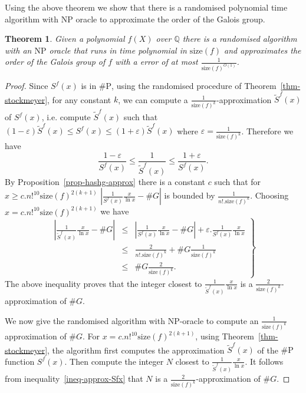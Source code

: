\documentclass[11pt]{madras}%
\newtheorem{theorem}{Theorem}[chapter]
\theoremstyle{remark}
\newcommand{\size}[1]{{\ensuremath{\mathrm{size}\left(#1\right)}}}
\begin{document}
Using the above theorem we show that there is a randomised polynomial
time algorithm with $\mathrm{NP}$ oracle to approximate the order of
the Galois group.

\begin{theorem}\label{thm-order-approximating}
  Given a polynomial $f(X)$ over $\mathbb{Q}$ there is a randomised
  algorithm with an $\mathrm{NP}$ oracle that runs in time polynomial
  in $\size{f}$ and approximates the order of the Galois group of $f$
  with a error of at most $\frac{1}{\size{f}^{O(1)}}$.
\end{theorem}
\begin{proof}
  Since $S^f(x)$ is in $\# \mathrm{P}$, using the randomised procedure
  of Theorem~\ref{thm-stockmeyer}, for any constant $k$, we can
  compute a $\frac{1}{\size{f}^k}$-approximation $\tilde{S}^f(x)$ of
  $S^f(x)$, i.e. compute $\tilde{S}^f(x)$ such that $(1 -
  \varepsilon)\tilde{S}^f(x) \leq S^f(x) \leq (1 + \varepsilon
  )\tilde{S}^f(x)$ where $\varepsilon = \frac{1}{\size{f}^k}$.
  Therefore we have
  \[
  \frac{1 - \varepsilon}{S^f(x)} \leq \frac{1}{\tilde{S}^f(x)} 
  \leq \frac{1 + \varepsilon}{S^f(x)}.
  \]
  By Proposition~\ref{prop-hashg-approx} there is a constant $c$ such
  that for $x \geq c. n!^{10}\size{f}^{2(k+1)}$
  $\left|\frac{1}{S^f(x)}\frac{x}{\ln{x}} - \# G\right|$ is bounded by
  $\frac{1}{n!.\size{f}^k}$. Choosing $x = c.
  n!^{10}\size{f}^{2(k+1)}$ we have
  \begin{equation}
    \left.
      \begin{array}{ccc}
        \left| \frac{1}{\tilde{S}^f(x)}\frac{x}{\ln{x}} - \# G \right| &\leq&
        \left|\frac{1}{S^f(x)}\frac{x}{\ln{x}} - \# G\right| + \varepsilon.
        \frac{1}{S^f(x)}\frac{x}{\ln{x}}\\
        &\leq& \frac{2}{n!.\size{f}^k} + \#G \frac{1}{\size{f}^k} \\
        &\leq& \#G \frac{2}{\size{f}^k}.
      \end{array}
    \right\}
    \label{ineq-approx-Sfx}
  \end{equation}
  The above inequality proves that the integer closest to
  $\frac{1}{\tilde{S}^f(x)}\frac{x}{\ln{x}}$ is a
  $\frac{2}{\size{f}^k}$-approximation of $\# G$. 

  We now give the randomised algorithm with NP-oracle to compute an
  $\frac{1}{\size{f}^k}$ approximation of $\#G$.  For $x =
  c.n!^{10}\size{f}^{2(k+1)}$, using Theorem~\ref{thm-stockmeyer}, the
  algorithm first computes the approximation $\tilde{S}^f(x)$ of the
  $\# \mathrm{P}$ function $S^f(x)$. Then compute the integer $N$
  closest to $\frac{1}{\tilde{S}^f(x)}\frac{x}{\ln{x}}$.  It follows
  from inequality~\ref{ineq-approx-Sfx} that $N$ is a
  $\frac{2}{\size{f}^k}$-approximation of $\#G$.
\end{proof}
\end{document}
